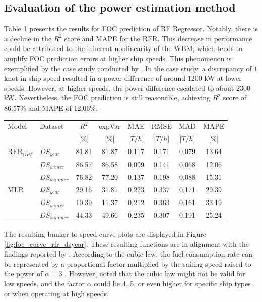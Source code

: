\documentclass[]{interact}
\theoremstyle{plain}%
\theoremstyle{definition}
\theoremstyle{remark}
\begin{document}
\subsection{Evaluation of the power estimation method}\label{sec:power_estimate_eval_j}

Table \ref{tbl:FOC_scores_errors} presents the results for FOC prediction of RF Regressor. Notably, there is a decline in the $R^2$ score and MAPE for the RFR. This decrease in performance could be attributed to the inherent nonlinearity of the WBM, which tends to amplify FOC prediction errors at higher ship speeds. This phenomenon is exemplified by the case study conducted by \citet{Birk.2019}. In the case study, a discrepancy of $1$ knot in ship speed resulted in a power difference of around $1200$ kW at lower speeds. However, at higher speeds, the power difference escalated to about $2300$ kW. Nevertheless, the FOC prediction is still reasonable, achieving $R^2$ score of 86.57\% and MAPE of 12.06\%.

\begin{table}
  {\begin{tabular}{ l l c c c c c c }
  \hline
  Model & Dataset & $R^2$ & expVar & MAE & RMSE & MAD & MAPE \\
  & & [$\%$] & [$\%$] & [$T/h$] & [$T/h$] & [$T/h$] & [$\%$]  \\ 
  \hline
  $\text{RFR}_{OPT}$ & $DS_{year}$  & 81.81 & 81.87 & 0.117 & 0.171 & 0.079 & 13.64 \\
  & $DS_{winter}$ & 86.57 & 86.58 & 0.099 & 0.141 & 0.068 & 12.06 \\
  & $DS_{summer}$ & 76.82 & 77.20 & 0.137 & 0.198 & 0.088 & 15.31 \\
  MLR & $DS_{year}$ & 29.16 & 31.81 & 0.223 & 0.337 & 0.171 & 29.39 \\
  & $DS_{winter}$ & 10.39 & 11.37 & 0.212 & 0.363 &0.161& 33.19 \\
  & $DS_{summer}$ & 44.33 & 49.66 & 0.235 & 0.307 & 0.191 & 25.24 \\
  \hline
  \end{tabular}}
\label{tbl:FOC_scores_errors}
\end{table}

The resulting bunker-to-speed curve plots are displayed in Figure \ref{fig:foc_curve_rfr_dsyear}. These resulting functions are in alignment with the findings reported by \citet{Psaraftis.2013}. According to the cubic law, the fuel consumption rate can be represented by a proportional factor multiplied by the sailing speed raised to the power of $\alpha = 3$ \citep{Du.2019}. However, \citet{Psaraftis.2013} noted that the cubic law might not be valid for low speeds, and the factor $\alpha$ could be 4, 5, or even higher for specific ship types or when operating at high speeds.
\end{document}
